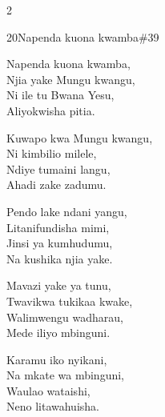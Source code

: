 \documentclass{article}
\begin{document}
\begin{multicols}{2}
\begin{hymn}{20}{Napenda kuona kwamba}{\#39}
\begin{stanza}
Napenda kuona kwamba,\\
Njia yake Mungu kwangu,\\
Ni ile tu Bwana Yesu,\\
Aliyokwisha pitia.
\end{stanza}
\begin{chorus}
Kuwapo kwa Mungu kwangu,\\
Ni kimbilio milele,\\
Ndiye tumaini langu,\\
Ahadi zake zadumu.
\end{chorus}
\begin{stanza}
Pendo lake ndani yangu,\\
Litanifundisha mimi,\\
Jinsi ya kumhudumu,\\
Na kushika njia yake.
\end{stanza}
\begin{stanza}
Mavazi yake ya tunu,\\
Twavikwa tukikaa kwake,\\
Walimwengu wadharau,\\
Mede iliyo mbinguni.
\end{stanza}
\begin{stanza}
Karamu iko nyikani,\\
Na mkate wa mbinguni,\\
Waulao wataishi,\\
Neno litawahuisha.
\end{stanza}
\end{hymn}


\end{multicols}
\end{document}
